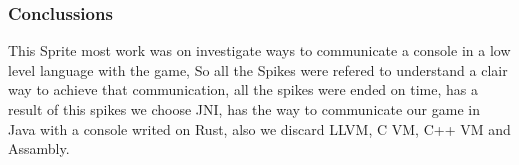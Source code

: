 \documentclass[a4paper,12pt]{article}
\begin{document}
\subsubsection{Conclussions}
This Sprite most work was on investigate ways to communicate a console in a low level language with the game, So all the Spikes were refered to understand a clair way to achieve that communication, all the spikes were ended on time, has a result of this spikes we choose JNI, has the way to communicate our game in Java with a console writed on Rust, also we discard LLVM, C VM, C++ VM and Assambly.
\end{document}
